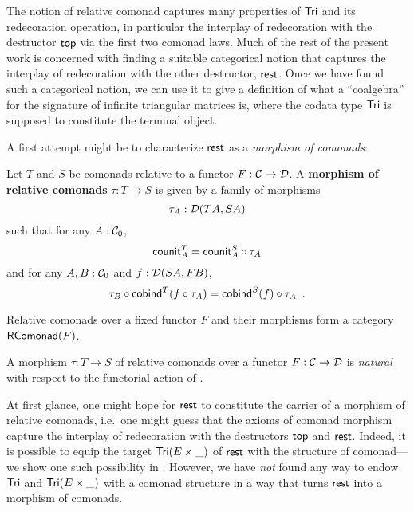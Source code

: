 \documentclass[conference,10pt]{IEEEtran}
\newcommand{\fat}[1]{\textbf{#1}}
\begin{document}
The notion of relative comonad captures many properties of $\Tri$ and its redecoration operation, in particular the interplay
of redecoration with the destructor $\head$ via the first two comonad laws.
Much of the rest of the present work is concerned with finding a suitable categorical notion that captures the interplay 
of redecoration with the other destructor, $\tail$. Once we have found such a categorical notion, we can use 
it to give a definition of what a \enquote{coalgebra} for the signature of infinite triangular matrices is, 
where the codata type $\Tri$ is supposed to constitute the terminal object.

A first attempt might be to characterize $\tail$ as a \emph{morphism of comonads}:


\begin{definition}\label{def:comonad_morphism}
 Let $T$ and $S$ be comonads relative to a functor $F : \C \to \D$. A \fat{morphism of relative comonads} $\tau : T \to S$
  is given by a family of morphisms \[\tau_A : \D(TA,SA)\] such that for any $A : \C_0$,
     \[  \counit^T_A = \comp{\tau_A}{\counit^S_A} \]
   and for any $A,B : \C_0$ and $f : \D(SA,FB)$,
   \[  \comp{\cobind^T(\comp{\tau_A}{f})}{\tau_B} = \comp{\tau_A}{\cobind^S(f)} \enspace .  \]
\end{definition}

Relative comonads over a fixed functor $F$ and their morphisms form a category $\RComonad(F)$.

\begin{remark}
A morphism $\tau : T\to S$ of relative comonads over a functor $F:\C\to\D$ is  \emph{natural}
with respect to the functorial action of .
\end{remark}




At first glance, one might hope for $\tail$ to constitute the carrier of a morphism of relative comonads, i.e.\ one might 
guess that the axioms of comonad morphism capture the interplay of redecoration with the destructors $\head$ and $\tail$.
Indeed, it is possible to equip the target $\Tri(E\times \_)$ of $\tail$ with the structure of comonad---we show one such
possibility in . However, we have \emph{not} found any way to endow $\Tri$ and $\Tri(E\times \_)$ with a comonad structure in a way
that turns $\tail$ into a morphism of comonads.
\end{document}

